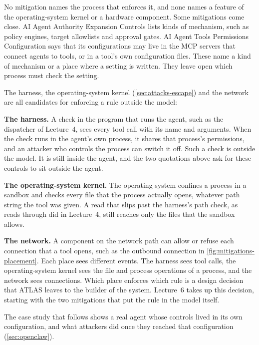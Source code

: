 No mitigation names the process that enforces it, and none names a feature of the operating-system
kernel or a hardware component. Some mitigations come close. AI Agent Authority Expansion Controls
lists kinds of mechanism, such as policy engines, target allowlists and approval gates. AI Agent
Tools Permissions Configuration says that its configurations may live in the MCP servers that
connect agents to tools, or in a tool's own configuration files. These name a kind of mechanism or a
place where a setting is written. They leave open which process must check the setting.

The harness, the operating-system kernel (\cref{sec:attacks-escape}) and the network are all
candidates for enforcing a rule outside the model:
\bi
\item \textbf{The harness.} A check in the program that runs the agent, such as the dispatcher of
Lecture~4, sees every tool call with its name and arguments. When the check runs in the agent's own
process, it shares that process's permissions, and an attacker who controls the process can switch
it off. Such a check is outside the model. It is still inside the agent, and the two quotations
above ask for these controls to sit outside the agent.
\item \textbf{The operating-system kernel.} The operating system confines a process in a sandbox and
checks every file that the process actually opens, whatever path string the tool was given. A read
that slips past the harness's path check, as reads through  did in Lecture~4, still
reaches only the files that the sandbox allows.
\item \textbf{The network.} A component on the network path can allow or refuse each connection
that a tool opens, such as the outbound connection in \cref{fig:mitigations-placement}.
\ei
Each place sees different events. The harness sees tool calls, the operating-system kernel sees the
file and process operations of a process, and the network sees connections. Which place enforces which rule is a
design decision that ATLAS leaves to the builder of the system. Lecture~6 takes up this decision,
starting with the two mitigations that put the rule in the model itself.

The case study that follows shows a real agent whose controls lived in its own configuration, and
what attackers did once they reached that configuration (\cref{sec:openclaw}).

